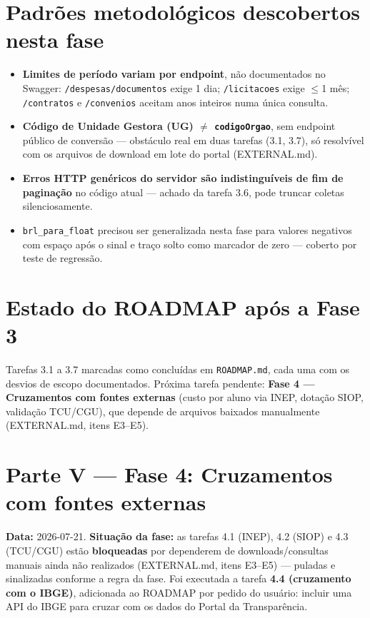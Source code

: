 \documentclass[11pt,a4paper]{article}
\begin{document}
\section{Padrões metodológicos descobertos nesta fase}

\begin{itemize}
    \item \textbf{Limites de período variam por endpoint}, não
    documentados no Swagger: \texttt{/despesas/documentos} exige 1 dia;
    \texttt{/licitacoes} exige $\leq$1 mês; \texttt{/contratos} e
    \texttt{/convenios} aceitam anos inteiros numa única consulta.
    \item \textbf{Código de Unidade Gestora (UG) $\neq$ \texttt{codigoOrgao}},
    sem endpoint público de conversão --- obstáculo real em duas tarefas
    (3.1, 3.7), só resolvível com os arquivos de download em lote do
    portal (EXTERNAL.md).
    \item \textbf{Erros HTTP genéricos do servidor são indistinguíveis de
    fim de paginação} no código atual --- achado da tarefa 3.6, pode
    truncar coletas silenciosamente.
    \item \texttt{brl\_para\_float} precisou ser generalizada nesta fase
    para valores negativos com espaço após o sinal e traço solto como
    marcador de zero --- coberto por teste de regressão.
\end{itemize}

\section{Estado do ROADMAP após a Fase 3}

Tarefas 3.1 a 3.7 marcadas como concluídas em \texttt{ROADMAP.md}, cada
uma com os desvios de escopo documentados. Próxima tarefa pendente:
\textbf{Fase 4 --- Cruzamentos com fontes externas} (custo por aluno via
INEP, dotação SIOP, validação TCU/CGU), que depende de arquivos baixados
manualmente (EXTERNAL.md, itens E3--E5).

\clearpage
\section*{Parte V --- Fase 4: Cruzamentos com fontes externas}

\textbf{Data:} 2026-07-21. \textbf{Situação da fase:} as tarefas 4.1
(INEP), 4.2 (SIOP) e 4.3 (TCU/CGU) estão \textbf{bloqueadas} por
dependerem de downloads/consultas manuais ainda não realizados
(EXTERNAL.md, itens E3--E5) --- puladas e sinalizadas conforme a regra da
fase. Foi executada a tarefa \textbf{4.4 (cruzamento com o IBGE)},
adicionada ao ROADMAP por pedido do usuário: incluir uma API do IBGE para
cruzar com os dados do Portal da Transparência.
\end{document}

